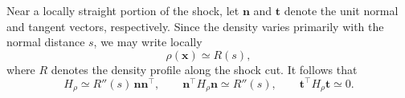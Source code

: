 \documentclass[11pt,a4paper]{article}
\begin{document}
\hfill
\begin{minipage}[c]{0.68\linewidth}
    \raggedright

    Near a locally straight portion of the shock, let
    $\mathbf n$ and $\mathbf t$ denote the unit normal
    and tangent vectors, respectively. Since the density
    varies primarily with the normal distance $s$, we may
    write locally
    \[
        \rho(\mathbf x)\simeq R(s),
    \]
    where $R$ denotes the density profile along the
    shock cut. It follows that
    \begin{equation}
        H_\rho \simeq R''(s)\,\mathbf n\mathbf n^\top,
        \qquad
        \mathbf n^\top H_\rho \mathbf n \simeq R''(s),
        \qquad
        \mathbf t^\top H_\rho \mathbf t \simeq 0.
    \end{equation}
\vspace{3pt}
\end{minipage}
\end{document}
